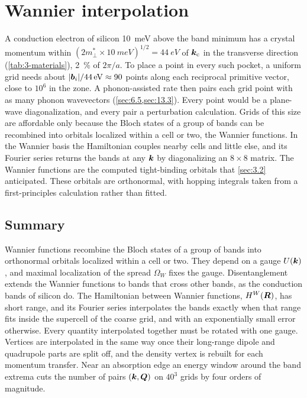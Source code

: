 \chapter{Wannier interpolation}\label{chap:27}

A conduction electron of silicon \SI{10}{meV} above the band minimum has a crystal momentum within $(2m^*_\perp\times\SI{10}{meV})^{1/2} = \SI{44}{eV}$ of $\bm{k}_{\mathrm{c}}$ in the transverse direction (\cref{tab:3-materials}), \SI{2}{\percent} of $2\pi/a$. To place a point in every such pocket, a uniform grid needs about $|\bm{b}_i|/\SI{44}{eV} \approx 90$ points along each reciprocal primitive vector, close to $10^6$ in the zone. A phonon-assisted rate then pairs each grid point with as many phonon wavevectors (\cref{sec:6.5,sec:13.3}). Every point would be a plane-wave diagonalization, and every pair a perturbation calculation. Grids of this size are affordable only because the Bloch states of a group of bands can be recombined into orbitals localized within a cell or two, the Wannier functions. In the Wannier basis the Hamiltonian couples nearby cells and little else, and its Fourier series returns the bands at any $\bm{k}$ by diagonalizing an $8\times8$ matrix. The Wannier functions are the computed tight-binding orbitals that \cref{sec:3.2} anticipated. These orbitals are orthonormal, with hopping integrals taken from a first-principles calculation rather than fitted.




\section*{Summary}

Wannier functions recombine the Bloch states of a group of bands into orthonormal orbitals localized within a cell or two. They depend on a gauge $U(\bm{k})$, and maximal localization of the spread $\Omega_W$ fixes the gauge. Disentanglement extends the Wannier functions to bands that cross other bands, as the conduction bands of silicon do. The Hamiltonian between Wannier functions, $H^W(\bm{R})$, has short range, and its Fourier series interpolates the bands exactly when that range fits inside the supercell of the coarse grid, and with an exponentially small error otherwise. Every quantity interpolated together must be rotated with one gauge. Vertices are interpolated in the same way once their long-range dipole and quadrupole parts are split off, and the density vertex is rebuilt for each momentum transfer. Near an absorption edge an energy window around the band extrema cuts the number of pairs $(\bm{k},\bm{Q})$ on $40^3$ grids by four orders of magnitude.

\printbibliography[heading=subbibliography]

